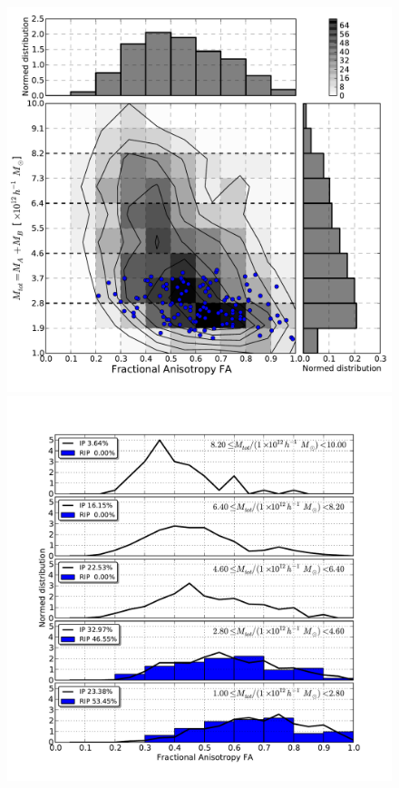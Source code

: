 \documentclass[a4,useAMS,usenatbib,usegraphicx]{latex/mn2e}
\begin{document}
\begin{flushleft}
\begin{figure}
\begin{center}

  \includegraphics[trim = 2mm 9mm 3mm 4mm, clip, keepaspectratio=true,
  width=0.36\textheight]{./figures/2D_totalmass_FA_BDM_Tweb}
  \includegraphics[trim = 4mm 9mm 17mm 15mm, clip, keepaspectratio=true,
  width=0.36\textheight]{./figures/single_totalmass_FA_BDM_Tweb}
  

\end{center}
\end{figure}
\end{flushleft}
\end{document}
